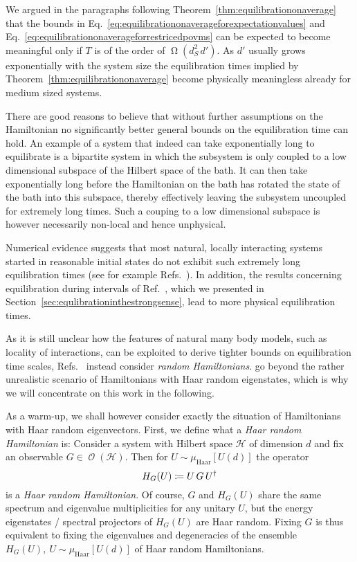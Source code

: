 \documentclass[a4paper,12pt,listof=totoc,index=totoc,bibliography=totoc,headsepline=false,headings=normal,BCOR16.153846mm,DIV12,headinclude,twoside,cleardoublepage=empty,numbers=noenddot,final]{scrreprt}
\theoremstyle{mystyle}
\numberwithin{equation}{section}
\numberwithin{figure}{section}
\numberwithin{lemma}{section}
\numberwithin{theorem}{section}
\numberwithin{corollary}{section}
\numberwithin{definition}{section}
\numberwithin{conjecture}{section}
\numberwithin{observation}{section}
\newcommand{\+}{\mkern2mu}
\newcommand{\coloneqq}{\mathrel{\vcentcolon\mkern-1.2mu=}} %
\newcommand{\texteqref}[1]{Eq.~\eqref{#1}}
\renewcommand{\H}{H}
\newcommand{\muhaar}{\mu_{\mathrm{Haar}}}
\DeclareMathOperator{\landauOmega}{\Omega}
\newcommand{\ad}{^\dagger}
\DeclareMathOperator{\1}{\mathds{1}}
\DeclareMathOperator{\Obs}{\mathcal{O}}
\newcommand{\mc}[1]{\mathcal{#1}}
\newcommand{\mcH}{\mc{H}}
\begin{document}
We argued in the paragraphs following Theorem~\ref{thm:equilibrationonaverage} that the bounds in \texteqref{eq:equilibrationonaverageforexpectationvalues} and \texteqref{eq:equilibrationonaverageforrestricedpovms} can be expected to become meaningful only if $T$ is of the order of $\landauOmega(d_S^2\,d')$.
As $d'$ usually grows exponentially with the system size the equilibration times implied by Theorem~\ref{thm:equilibrationonaverage} become physically meaningless already for medium sized systems.

There are good reasons to believe that without further assumptions on the Hamiltonian no significantly better general bounds on the equilibration time can hold.
An example of a system that indeed can take exponentially long to equilibrate is a bipartite system in which the subsystem is only coupled to a low dimensional subspace of the Hilbert space of the bath.
It can then take exponentially long before the Hamiltonian on the bath has rotated the state of the bath into this subspace, thereby effectively leaving the subsystem uncoupled for extremely long times.
Such a couping to a low dimensional subspace is however necessarily non-local and hence unphysical.

Numerical evidence suggests that most natural, locally interacting systems started in reasonable initial states do not exhibit such extremely long equilibration times (see for example Refs.~\cite{Rigol08,Venuti09,1108.2703v1,Sirker2013,Fagotti2012,Eckstein2008,Gemmer09,Campos10,1108.2703v1,Rigol11,1110.4690v1,Rigol07,Rigol2006,1104.0154v1,Torres-Herrera2013}).
In addition, the results concerning equilibration during intervals of Ref.~\cite{cramer10_1}, which we presented in Section~\ref{sec:equlibrationinthestrongsense}, lead to more physical equilibration times.

As it is still unclear how the features of natural many body models, such as locality of interactions, can be exploited to derive tighter bounds on equilibration time scales, Refs.~\cite{1108.2985v3,1108.0374,1112.5295v1,1107.6035v1} instead consider \emph{random Hamiltonians}.
\textcite{1108.0374} go beyond the rather unrealistic scenario of Hamiltonians with Haar random eigenstates, which is why we will concentrate on this work in the following.

As a warm-up, we shall however consider exactly the situation of Hamiltonians with Haar random eigenvectors.
First, we define what a \emph{Haar random Hamiltonian} is:
Consider a system with Hilbert space $\mcH$ of dimension $d$ and fix an observable $G \in \Obs(\mcH)$.
Then for $U \sim \muhaar[U(d)]$ the operator
\begin{equation} \label{eq:defrandomhamiltonian}
  \H_G(U) \coloneqq U\,G\,U\ad
\end{equation}
is a \emph{Haar random Hamiltonian}.
Of course, $G$ and $\H_G(U)$ share the same spectrum and eigenvalue multiplicities for any unitary $U$, but the energy eigenstates / spectral projectors of $\H_G(U)$ are Haar random.
Fixing $G$ is thus equivalent to fixing the eigenvalues and degeneracies of the ensemble $\H_G(U),\ U \sim \muhaar[U(d)]$ of Haar random Hamiltonians.
\end{document}
